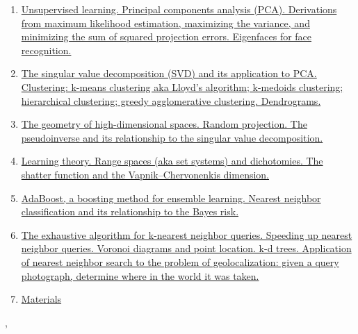 \documentclass[11pt]{article}
\renewcommand{\today}{\shortmonthname[\the\month] \the \day,  \the\year}
\begin{document}
\begin{enumerate}
	\item  \href{https://mp.weixin.qq.com/s/xc-ND7VF5KPcOJs0vlph9g}{Unsupervised learning. Principal components analysis (PCA). Derivations from maximum likelihood estimation, maximizing the variance, and minimizing the sum of squared projection errors. Eigenfaces for face recognition.} %
	\item  \href{https://mp.weixin.qq.com/s/NylGFLS2hpNb4zr748I4FQ}{The singular value decomposition (SVD) and its application to PCA. Clustering: k-means clustering aka Lloyd's algorithm; k-medoids clustering; hierarchical clustering; greedy agglomerative clustering. Dendrograms. } %
	\item  \href{https://mp.weixin.qq.com/s/zx9pddBElzCNFuR45IG9DA}{The geometry of high-dimensional spaces. Random projection. The pseudoinverse and its relationship to the singular value decomposition.} %
	\item  \href{https://mp.weixin.qq.com/s/PzYpBKg1uC1HJ0fg4QOawA}{ Learning theory. Range spaces (aka set systems) and dichotomies. The shatter function and the Vapnik–Chervonenkis dimension.} %
	\item  \href{https://mp.weixin.qq.com/s/ZV-BBhSOEkqZ1YiWtEqezg}{AdaBoost, a boosting method for ensemble learning. Nearest neighbor classification and its relationship to the Bayes risk.} %
	\item  \href{https://mp.weixin.qq.com/s/dZRt8hDcFl_0-X60xCdg4w}{The exhaustive algorithm for k-nearest neighbor queries. Speeding up nearest neighbor queries. Voronoi diagrams and point location. k-d trees. Application of nearest neighbor search to the problem of geolocalization: given a query photograph, determine where in the world it was taken.} %
	\item \href{https://pan.baidu.com/s/1h2j9Y4cql1mcMSs5X8MIqw}{Materials} 
\end{enumerate}




%
\begin{flushright}
	\tiny \today 
\end{flushright}
\end{document}
